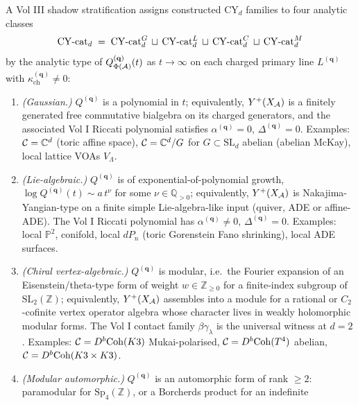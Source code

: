 \begin{theorem}
\label{thm:vol3-shadow-stratification}
A Vol III shadow stratification assigns constructed CY$_d$ families to
four analytic classes
\[
  \mathrm{CY}\text{-}\mathrm{cat}_{d}
  \;=\; \mathrm{CY}\text{-}\mathrm{cat}_{d}^{G}
  \,\sqcup\, \mathrm{CY}\text{-}\mathrm{cat}_{d}^{L}
  \,\sqcup\, \mathrm{CY}\text{-}\mathrm{cat}_{d}^{C}
  \,\sqcup\, \mathrm{CY}\text{-}\mathrm{cat}_{d}^{M}
\]
by the analytic type of $Q^{(\mathbf q)}_{\Phi(\mathcal{A})}(t)$ as
$t \to \infty$ on each charged primary line $L^{(\mathbf q)}$ with
$\kappa_{\mathrm{ch}}^{(\mathbf q)} \neq 0$:
\begin{enumerate}[label=\textup{(\roman*)}]
\item\label{vol3:G} \emph{(Gaussian.)} $Q^{(\mathbf q)}$ is a polynomial
  in $t$; equivalently, $Y^{+}(X_{\mathcal{A}})$ is a finitely generated free
  commutative bialgebra on its charged generators, and the associated
  Vol I Riccati polynomial satisfies $\alpha^{(\mathbf q)} = 0$,
  $\Delta^{(\mathbf q)} = 0$. Examples: $\mathcal{C} = \mathbb C^{d}$ (toric
  affine space), $\mathcal{C} = \mathbb C^{d}/G$ for $G \subset \mathrm{SL}_{d}$
  abelian (abelian McKay), local lattice VOAs $V_{\Lambda}$.
\item\label{vol3:L} \emph{(Lie-algebraic.)} $Q^{(\mathbf q)}$ is of
  exponential-of-polynomial growth,
  $\log Q^{(\mathbf q)}(t) \sim a\,t^{\nu}$ for some $\nu \in
  \mathbb Q_{>0}$; equivalently, $Y^{+}(X_{\mathcal{A}})$ is
  Nakajima-Yangian-type on a finite simple Lie-algebra-like input
  (quiver, ADE or affine-ADE). The Vol I Riccati polynomial has
  $\alpha^{(\mathbf q)} \neq 0$, $\Delta^{(\mathbf q)} = 0$. Examples:
  local $\mathbb P^{2}$, conifold, local $dP_{n}$ (toric Gorenstein
  Fano shrinking), local ADE surfaces.
\item\label{vol3:C} \emph{(Chiral vertex-algebraic.)}
  $Q^{(\mathbf q)}$ is modular, i.e.\ the Fourier expansion of an
  Eisenstein/theta-type form of weight $w \in \mathbb Z_{\ge 0}$ for a
  finite-index subgroup of $\mathrm{SL}_{2}(\mathbb Z)$; equivalently,
  $Y^{+}(X_{\mathcal{A}})$ assembles into a module for a rational or $C_{2}$
  -cofinite vertex operator algebra whose character lives in weakly
  holomorphic modular forms. The Vol I contact family
  $\beta\gamma_{\lambda}$ is the universal witness at $d = 2$. Examples:
  $\mathcal{C} = D^{b}\mathrm{Coh}(K3)$ Mukai-polarised, $\mathcal{C} = D^{b}\mathrm{Coh}(T^{4})$
  abelian, $\mathcal{C} = D^{b}\mathrm{Coh}(K3 \times K3)$.
\item\label{vol3:M} \emph{(Modular automorphic.)} $Q^{(\mathbf q)}$ is
  an automorphic form of rank $\ge 2$: paramodular for
  $\mathrm{Sp}_{4}(\mathbb Z)$, or a Borcherds product for an indefinite

\end{enumerate}
\end{theorem}
